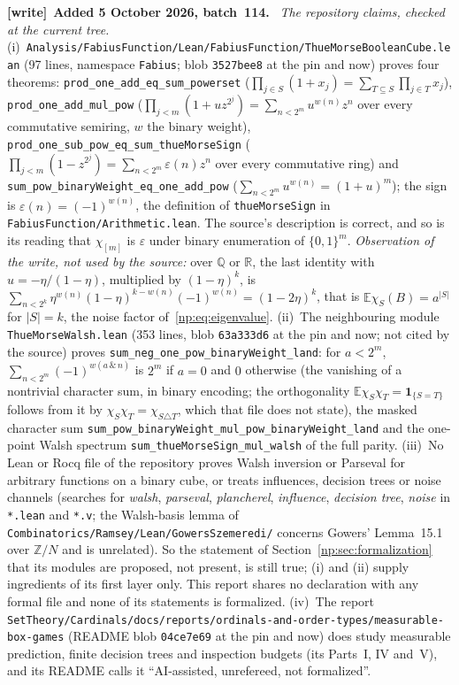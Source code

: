 \documentclass[11pt,a4paper]{article}
\theoremstyle{definition}
\theoremstyle{remark}
\newcommand{\R}{\mathbb R}
\newcommand{\E}{\mathbb E}
\newcommand{\one}{\mathbf 1}
\newcommand{\file}[1]{\nolinkurl{#1}}
\newenvironment{writenote}[1][]{\par\smallskip\begingroup\small
 \noindent\textbf{[write]}\if\relax\detokenize{#1}\relax\else~\textbf{#1.}\fi\ }%
 {\par\endgroup\smallskip}
\begin{document}
\begin{writenote}[Added 5 October 2026, batch~114]
\emph{The repository claims, checked at the current tree.}
(i)~\file{Analysis/FabiusFunction/Lean/FabiusFunction/ThueMorseBooleanCube.lean}
(97 lines, namespace \file{Fabius}; blob \file{3527bee8} at the pin and
now) proves four theorems: \file{prod_one_add_eq_sum_powerset}
($\prod_{j\in S}(1+x_j)=\sum_{T\subseteq S}\prod_{j\in T}x_j$),
\file{prod_one_add_mul_pow}
($\prod_{j<m}(1+uz^{2^j})=\sum_{n<2^m}u^{w(n)}z^n$ over every commutative
semiring, $w$ the binary weight),
\file{prod_one_sub_pow_eq_sum_thueMorseSign}
($\prod_{j<m}(1-z^{2^j})=\sum_{n<2^m}\varepsilon(n)z^n$ over every
commutative ring) and \file{sum_pow_binaryWeight_eq_one_add_pow}
($\sum_{n<2^m}u^{w(n)}=(1+u)^m$); the sign is
$\varepsilon(n)=(-1)^{w(n)}$, the definition of \file{thueMorseSign} in
\file{FabiusFunction/Arithmetic.lean}. The source's description is
correct, and so is its reading that $\chi_{[m]}$ is $\varepsilon$ under
binary enumeration of $\{0,1\}^m$. \emph{Observation of the write, not used
by the source:} over $\mathbb Q$ or $\R$, the last identity with
$u=-\eta/(1-\eta)$, multiplied by $(1-\eta)^k$, is
$\sum_{n<2^k}\eta^{w(n)}(1-\eta)^{k-w(n)}(-1)^{w(n)}=(1-2\eta)^k$, that is
$\E\chi_S(B)=a^{|S|}$ for $|S|=k$, the noise factor
of~\eqref{np:eq:eigenvalue}. (ii)~The neighbouring module
\file{ThueMorseWalsh.lean} (353 lines, blob \file{63a333d6} at the pin and
now; not cited by the source) proves
\file{sum_neg_one_pow_binaryWeight_land}: for $a<2^m$,
$\sum_{n<2^m}(-1)^{w(a\,\&\,n)}$ is $2^m$ if $a=0$ and $0$ otherwise (the
vanishing of a nontrivial character sum, in binary encoding; the
orthogonality $\E\chi_S\chi_T=\one_{\{S=T\}}$ follows from it by
$\chi_S\chi_T=\chi_{S\triangle T}$, which that file does not state), the
masked character sum \file{sum_pow_binaryWeight_mul_pow_binaryWeight_land}
and the one-point Walsh spectrum \file{sum_thueMorseSign_mul_walsh} of the
full parity. (iii)~No Lean or Rocq file of the repository proves Walsh
inversion or Parseval for arbitrary functions on a binary cube, or treats
influences, decision trees or noise channels (searches for
\emph{walsh}, \emph{parseval}, \emph{plancherel}, \emph{influence},
\emph{decision tree}, \emph{noise} in \file{*.lean} and \file{*.v}; the
Walsh-basis lemma of \file{Combinatorics/Ramsey/Lean/GowersSzemeredi/}
concerns Gowers' Lemma~15.1 over $\mathbb Z/N$ and is unrelated). So the
statement of Section~\ref{np:sec:formalization} that its modules are
proposed, not present, is still true; (i) and (ii) supply ingredients of its
first layer only. This report shares no declaration with any formal file
and none of its statements is formalized. (iv)~The report
\file{SetTheory/Cardinals/docs/reports/ordinals-and-order-types/measurable-box-games}
(README blob \file{04ce7e69} at the pin and now) does study measurable
prediction, finite decision trees and inspection budgets (its Parts~I, IV
and~V), and its README calls it ``AI-assisted, unrefereed, not
formalized''.


\end{writenote}
\end{document}
